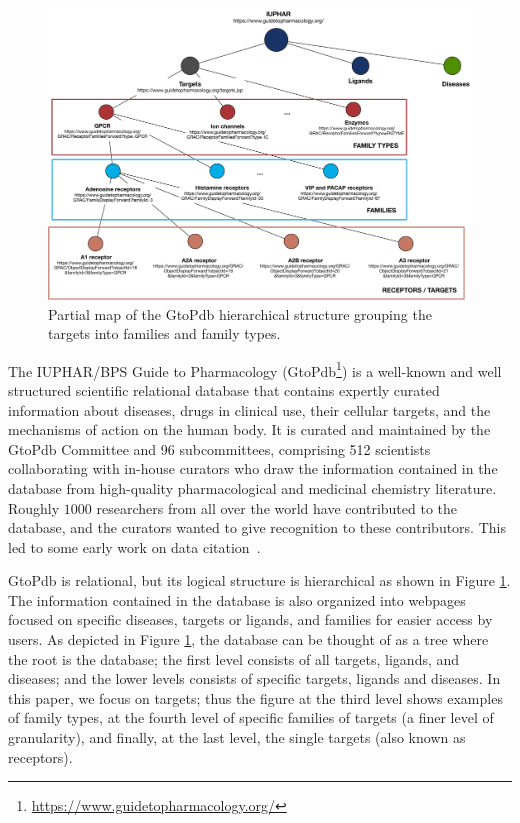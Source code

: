 \documentclass[preprint,12pt,sort&compress]{elsarticle}
\begin{document}
\begin{figure}[t]
\centering
  \includegraphics[width=.9\textwidth]{iuphar_schema}
  \caption{Partial map of the GtoPdb hierarchical structure grouping the targets into families and family types.}
  \label{figure:iuphar_schema}
\end{figure}

The IUPHAR/BPS Guide to Pharmacology \citep{iuphar2018}  (GtoPdb\footnote{\url{https://www.guidetopharmacology.org/}}) is a well-known and well structured scientific relational database that contains expertly curated information about diseases, drugs in clinical use, their cellular targets, and the mechanisms of action on the human body. 
It is curated and maintained by the GtoPdb Committee and 96 subcommittees, comprising 512 scientists collaborating with in-house curators who draw the information contained in the database from high-quality pharmacological and medicinal chemistry literature.
Roughly $1000$ researchers from all over the world have contributed to the database, and the curators wanted to give recognition to these contributors.  This led to some early work on data citation~\citep{buneman2006cite}.  

GtoPdb is relational, but its logical structure is hierarchical as shown in Figure \ref{figure:iuphar_schema}.  The information contained in the database is also organized into webpages focused on specific diseases, targets or ligands, and families %
for easier access by users. 
As depicted in Figure \ref{figure:iuphar_schema}, the database can be thought of as a tree where the root is the database; the first level consists of all targets, ligands, and diseases; and the lower levels consists of specific targets, ligands and diseases. 
In this paper, we focus on targets; thus the figure at the third level shows examples of family types, at the fourth level of specific families of targets (a finer level of granularity), and finally, at the last level, the single targets (also known as receptors). 
\end{document}
